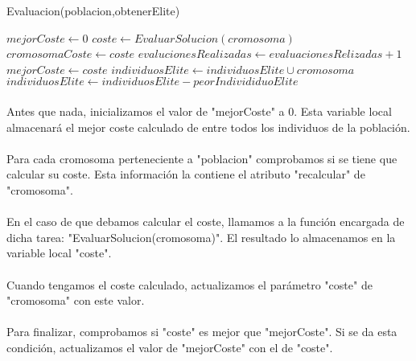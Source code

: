 	\begin{algorithm}[H]
		\caption{Evaluacion(poblacion,obtenerElite)}
		\begin{algorithmic}
			\STATE $mejorCoste \leftarrow 0$
					\STATE $ coste \leftarrow EvaluarSolucion(cromosoma)$
					\STATE $ cromosomaCoste \leftarrow coste$
					\STATE $ evalucionesRealizadas \leftarrow evaluacionesRelizadas + 1$
						\STATE $ mejorCoste \leftarrow coste $
							\STATE $individuosElite \leftarrow individuosElite \cup cromosoma $
							\STATE $individuosElite \leftarrow individuosElite - peorIndivididuoElite$
						\ENDIF 
					\ENDIF 
				\ENDIF
			\ENDFOR
		\end{algorithmic}
	\end{algorithm}

	\paragraph{}Antes que nada, inicializamos el valor de "mejorCoste" a 0. Esta variable local almacenará el mejor coste calculado de entre todos los individuos de la población.
	
	\paragraph{}Para cada cromosoma perteneciente a "poblacion" comprobamos si se tiene que calcular su coste. Esta información la contiene el atributo "recalcular" de "cromosoma".
	
	\paragraph{}En el caso de que debamos calcular el coste, llamamos a la función encargada de dicha tarea: "EvaluarSolucion(cromosoma)". El resultado lo almacenamos en la variable local "coste".
	
	\paragraph{}Cuando tengamos el coste calculado, actualizamos el parámetro "coste" de "cromosoma"  con este valor.
	
	\paragraph{}Para finalizar, comprobamos si "coste" es mejor que "mejorCoste". Si se da esta condición, actualizamos el valor de "mejorCoste" con el de "coste".
	
